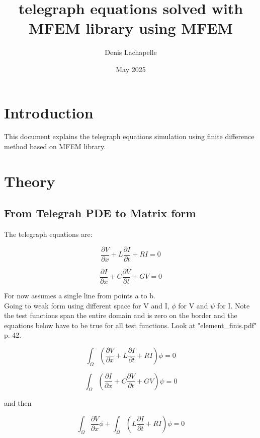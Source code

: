 \documentclass[12pt, letterpaper]{article}
\title{telegraph equations solved with MFEM library using MFEM}
\author{Denis Lachapelle}
\date{May 2025}
\begin{document}
\maketitle

\section{Introduction}
This document explains the telegraph equations simulation using finite difference method based on MFEM library.

\section{Theory}

\subsection{From Telegrah PDE to Matrix form}

The telegraph equations are:

  \begin{equation}\frac{\partial{V}}{\partial{x}} + L \frac{\partial{I}}{\partial{t}} + R I = 0\end{equation}


\begin{equation}\frac{\partial{I}}{\partial{x}} + C \frac{\partial{V}}{\partial{t}} + G V = 0\end{equation}

For now assumes a single line from points a to b.\\

Going to weak form using different space for V and I, $\phi$ for V and $\psi$ for I. Note the test functions span the entire domain and is zero on the border and the equations below have to be true for all test functions. Look at "element\_finis.pdf" p. 42.

\begin{equation}\int_\Omega(\frac{\partial{V}}{\partial{x}} + L \frac{\partial{I}}{\partial{t}} + R I) \phi = 0\end{equation}

\begin{equation}\int_\Omega(\frac{\partial{I}}{\partial{x}} + C \frac{\partial{V}}{\partial{t}} + G V) \psi = 0\end{equation}

and then


\begin{equation}
\int_\Omega\frac{\partial{V}}{\partial{x}} \phi
+ \int_\Omega(L \frac{\partial{I}}{\partial{t}} +  R I) \phi
= 0
\end{equation}
\end{document}
